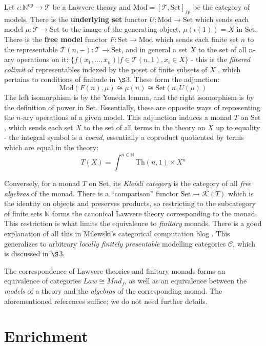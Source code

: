 \documentclass[a4paper,UKenglish]{article}
\theoremstyle{definition}
\newcommand{\Th}{\mathrm{Th}}
\newcommand{\Set}{\mathrm{Set}}
\newcommand{\Mod}{\mathrm{Mod}}
\newcommand{\op}{\mathrm{op}}
\newcommand{\NN}{\mathbb{N}}
\newcommand{\C}{\mathscr{C}}
\newcommand{\T}{\mathscr{T}}
\newcommand{\K}{\mathscr{K}}
\begin{document}
Let $\iota: \NN^\op \to \T$ be a Lawvere theory and $\Mod = [\T,\Set]_{fp}$ be the category of models. There is the \textbf{underlying set} functor $U:\Mod \to \Set$ which sends each model $\mu: \T \to \Set$ to the image of the generating object, $\mu(\iota(1)) = X$ in $\Set$. There is the \textbf{free model} functor $F:\Set \to \Mod$ which sends each finite set $n$ to the representable $\T(n,-):\T \to \Set$, and in general a set $X$ to the set of all $n$-ary operations on it: $\{f(x_1,...,x_n)|f\in \T(n,1), x_i\in X\}$ - this is the \textit{filtered colimit} of representables indexed by the poset of finite subsets of $X$ \cite{nlab}, which pertains to conditions of finitude in $\S$3. These form the adjunction: $$\Mod(F(n),\mu) \cong \mu(n) \cong \Set(n,U(\mu))$$ The left isomorphism is by the Yoneda lemma, and the right isomorphism is by the definition of power in $\Set$. Essentially, these are opposite ways of representing the $n$-ary operations of a given model. This adjunction induces a monad $T$ on $\Set$, which sends each set $X$ to the set of all terms in the theory on $X$ up to equality - the integral symbol is a \textit{coend}, essentially a coproduct quotiented by terms which are equal in the theory: $$T(X) = \int^{n\in \NN} \Th(n,1) \times X^n$$

Conversely, for a monad $T$ on $\Set$, its \textit{Kleisli category} is the category of all \textit{free algebras} of the monad. There is a ``comparison'' functor $\Set \to \K(T)$ which is the identity on objects and preserves products, so restricting to the subcategory of finite sets $\NN$ forms the canonical Lawvere theory corresponding to the monad. This restriction is what limits the equivalence to \textit{finitary} monads. There is a good explanation of all this in Milewski's categorical computation blog \cite{milew}. This generalizes to arbitrary \textit{locally finitely presentable} modelling categories $\C$, which is discussed in $\S$3.

The correspondence of Lawvere theories and finitary monads forms an equivalence of categories $Law \cong Mnd_f$, as well as an equivalence between the \textit{models} of a theory and the \textit{algebras} of the corresponding monad. The aforementioned references suffice; we do not need further details. 

\section{Enrichment}
\end{document}
